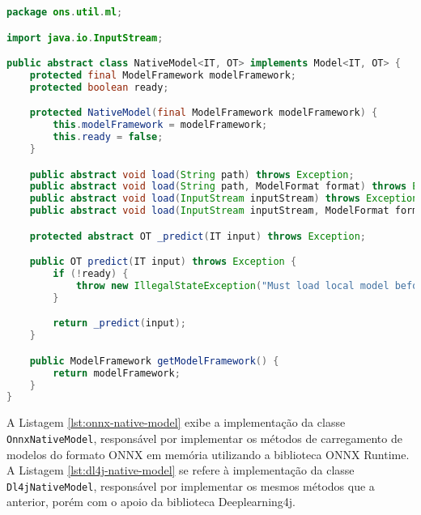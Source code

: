 \begin{lstlisting}[language=Java, caption=Implementação da classe abstrata NativeModel, label={lst:native-model}]
package ons.util.ml;

import java.io.InputStream;

public abstract class NativeModel<IT, OT> implements Model<IT, OT> {
    protected final ModelFramework modelFramework;
    protected boolean ready;

    protected NativeModel(final ModelFramework modelFramework) {
        this.modelFramework = modelFramework;
        this.ready = false;
    }

    public abstract void load(String path) throws Exception;
    public abstract void load(String path, ModelFormat format) throws Exception;
    public abstract void load(InputStream inputStream) throws Exception;
    public abstract void load(InputStream inputStream, ModelFormat format) throws Exception;

    protected abstract OT _predict(IT input) throws Exception;

    public OT predict(IT input) throws Exception {
        if (!ready) {
            throw new IllegalStateException("Must load local model before predicting");
        }

        return _predict(input);
    }

    public ModelFramework getModelFramework() {
        return modelFramework;
    }
}
\end{lstlisting}

A Listagem \ref{lst:onnx-native-model} exibe a implementação da classe \texttt{OnnxNativeModel}, responsável por implementar os métodos de carregamento de modelos do formato ONNX em memória utilizando a biblioteca ONNX Runtime. A Listagem \ref{lst:dl4j-native-model} se refere à implementação da classe \texttt{Dl4jNativeModel}, responsável por implementar os mesmos métodos que a anterior, porém com o apoio da biblioteca Deeplearning4j.

